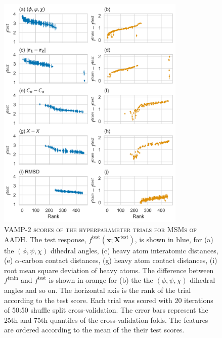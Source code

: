 \begin{figure}[p]
    \centering
    \includegraphics[width=0.8\textwidth]{chapters/msm_optimization/figures/aadh_train_test_results.png}
    \caption[VAMP-2 scores of the hyperparameter trials for MSMs of AADH]{\textsc{VAMP-2 scores of the hyperparameter trials for MSMs of AADH}. The test response, $f^{\mathrm{test}}(\mathbf{x}; \mathbf{X}^{\mathrm{test}})$, is shown in blue, for (a) the $(\phi, \psi, \chi)$ dihedral angles, (c) heavy atom interatomic distances, (e) $\alpha$-carbon contact distances, (g) heavy atom contact distances, (i) root mean square deviation of heavy atoms. The difference between $f^{\mathrm{train}}$ and $f^{\mathrm{test}}$ is shown in orange for (b) the the $(\phi, \psi, \chi)$ dihedral angles and so on. The horizontal axis is the rank of the trial according to the test score. Each trial was scored with \num{20} iterations of 50:50 shuffle split cross-validation. The error bars represent the 25th and 75th quantiles of the cross-validation folds. The features are ordered according to the mean of the their test scores.}
    \label{fig:aad_train_test}
\end{figure}

